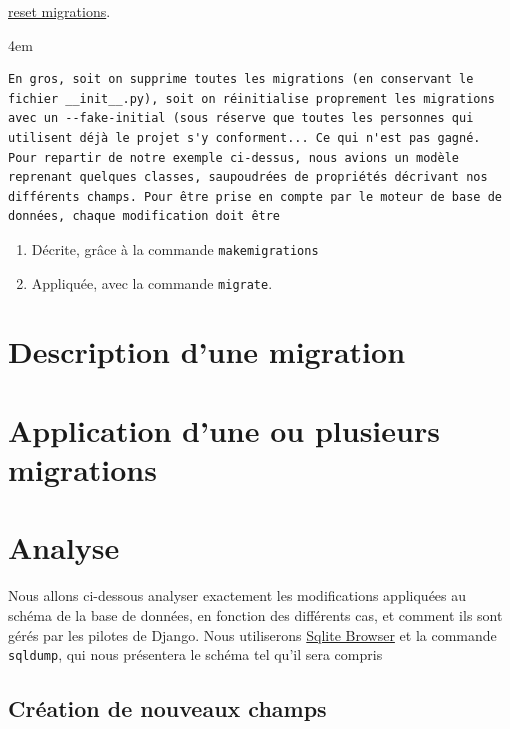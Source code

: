 \documentclass[11pt]{amsbook}
\renewenvironment{quotation}
{   \leftskip 4em \begin{em} }
{\end{em}\par }
\begin{document}
\href{https://simpleisbetterthancomplex.com/tutorial/2016/07/26/how-to-reset-migrations.html}{reset migrations}.


\begin{quotation}
\begin{verbatim}
En gros, soit on supprime toutes les migrations (en conservant le fichier __init__.py), soit on réinitialise proprement les migrations avec un --fake-initial (sous réserve que toutes les personnes qui utilisent déjà le projet s'y conforment... Ce qui n'est pas gagné.
Pour repartir de notre exemple ci-dessus, nous avions un modèle reprenant quelques classes, saupoudrées de propriétés décrivant nos différents champs. Pour être prise en compte par le moteur de base de données, chaque modification doit être
\end{verbatim}
\end{quotation}

\begin{enumerate}

\item{Décrite, grâce à la commande \texttt{makemigrations}}

\item{Appliquée, avec la commande \texttt{migrate}.}

\end{enumerate}


\hypertarget{x-description-d’une-migration}{\section{Description d’une migration}}

\hypertarget{x-application-d’une-ou-plusieurs-migrations}{\section{Application d’une ou plusieurs migrations}}

\hypertarget{x-analyse}{\section{Analyse}}
Nous allons ci-dessous analyser exactement les modifications appliquées au schéma de la base de données, en fonction des différents cas, et comment ils sont gérés par les pilotes de Django.
Nous utiliserons \href{https://sqlitebrowser.org/}{Sqlite Browser} et la commande \texttt{sqldump}, qui nous présentera le schéma tel qu’il sera compris


\hypertarget{x-création-de-nouveaux-champs}{\subsection{Création de nouveaux champs}}
\end{document}
